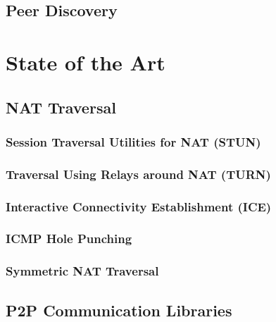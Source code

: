 

\section{Peer Discovery}


\chapter{State of the Art}

\section{NAT Traversal}

\subsection{Session Traversal Utilities for NAT (STUN)}

\subsection{Traversal Using Relays around NAT (TURN)}

\subsection{Interactive Connectivity Establishment (ICE)}

\subsection{ICMP Hole Punching}

\subsection{Symmetric NAT Traversal}

\section{P2P Communication Libraries}


